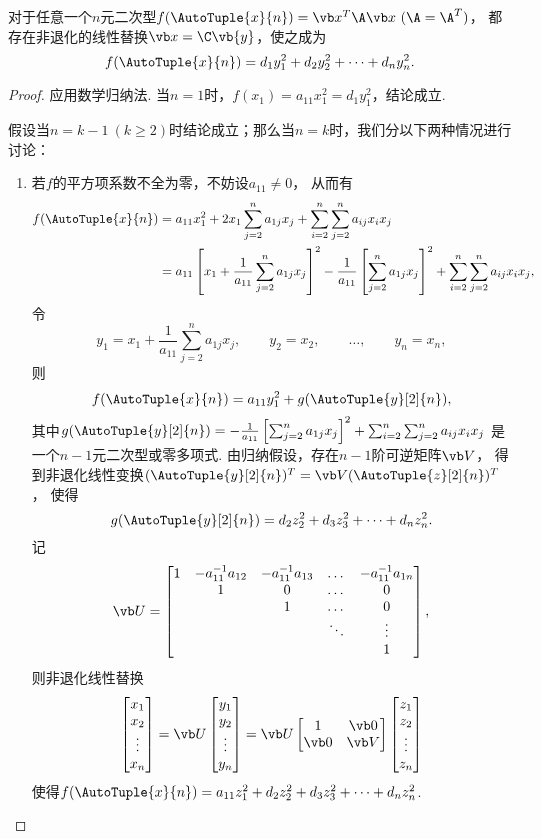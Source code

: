 \begin{theorem}
对于任意一个\(n\)元二次型\(f(\AutoTuple{x}{n})=\x^T\A\x\ (\A=\A^T)\)，
都存在非退化的线性替换\(\x=\C\vb{y}\)，使之成为\[
f(\AutoTuple{x}{n})=d_1 y_1^2 + d_2 y_2^2 + \dotsb + d_n y_n^2.
\]
\begin{proof}
应用数学归纳法.
当\(n=1\)时，\(f(x_1) = a_{11} x_1^2 = d_1 y_1^2\)，结论成立.

假设当\(n=k-1\ (k\geq2)\)时结论成立；那么当\(n=k\)时，我们分以下两种情况进行讨论：
\begin{enumerate}
\item 若\(f\)的平方项系数不全为零，不妨设\(a_{11}\neq0\)，
从而有\begin{align*}
	f(\AutoTuple{x}{n})
	&= a_{11} x_1^2 + 2 x_1 \sum_{j=2}^n a_{1j} x_j
		+ \sum_{i=2}^n \sum_{j=2}^n a_{ij} x_i x_j \\
	&= a_{11} \left[
		x_1 + \frac{1}{a_{11}} \sum_{j=2}^n a_{1j} x_j
	\right]^2
	- \frac{1}{a_{11}} \left[
		\sum_{j=2}^n a_{1j} x_j
	\right]^2
	+ \sum_{i=2}^n \sum_{j=2}^n a_{ij} x_i x_j,
\end{align*}
令\[
	y_1 = x_1 + \frac{1}{a_{11}} \sum_{j=2}^n a_{1j} x_j, \qquad
	y_2 = x_2, \qquad
	\dotsc, \qquad
	y_n = x_n,
\]
则\[
	f(\AutoTuple{x}{n}) = a_{11} y_1^2 + g(\AutoTuple{y}[2]{n}),
\]
其中\(g(\AutoTuple{y}[2]{n})
= - \frac{1}{a_{11}} \left[
	\sum_{j=2}^n a_{1j} x_j
\right]^2
+ \sum_{i=2}^n \sum_{j=2}^n a_{ij} x_i x_j\)%
是一个\(n-1\)元二次型或零多项式.
由归纳假设，存在\(n-1\)阶可逆矩阵\(\Q\)，
得到非退化线性变换\((\AutoTuple{y}[2]{n})^T = \Q (\AutoTuple{z}[2]{n})^T\)，
使得\[
	g(\AutoTuple{y}[2]{n})
	= d_2 z_2^2 + d_3 z_3^2 + \dotsb + d_n z_n^2.
\]
记\[
	\P = \begin{bmatrix}
		1 & -a_{11}^{-1} a_{12} & -a_{11}^{-1} a_{13} & \dots & -a_{11}^{-1} a_{1n} \\
		& 1 & 0 & \dots & 0 \\
		& & 1 & \dots & 0 \\
		& & & \ddots & \vdots \\
		& & & & 1
	\end{bmatrix},
\]则非退化线性替换\[
	\begin{bmatrix}
		x_1 \\ x_2 \\ \vdots \\ x_n
	\end{bmatrix}
	= \P \begin{bmatrix}
		y_1 \\ y_2 \\ \vdots \\ y_n
	\end{bmatrix}
	= \P \begin{bmatrix} 1 & \vb0 \\ \vb0 & \Q \end{bmatrix} \begin{bmatrix}
		z_1 \\ z_2 \\ \vdots \\ z_n
	\end{bmatrix}
\]
使得\(f(\AutoTuple{x}{n}) = a_{11} z_1^2 + d_2 z_2^2 + d_3 z_3^2 + \dotsb + d_n z_n^2\).


\end{enumerate}
\end{proof}
\end{theorem}
